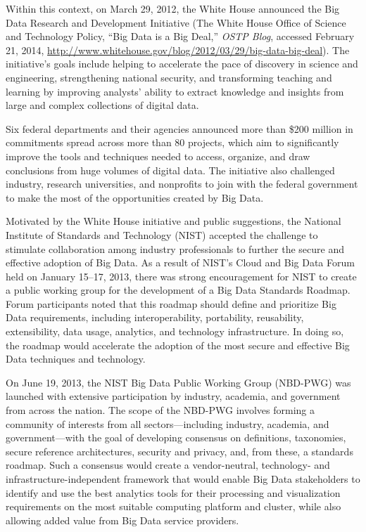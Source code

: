 \documentclass[9pt,]{article}
\begin{document}
Within this context, on March 29, 2012, the White House announced the
Big Data Research and Development Initiative (The White House Office of
Science and Technology Policy, ``Big Data is a Big Deal,'' \emph{OSTP
Blog}, accessed February 21, 2014,
\url{http://www.whitehouse.gov/blog/2012/03/29/big-data-big-deal}). The
initiative's goals include helping to accelerate the pace of discovery
in science and engineering, strengthening national security, and
transforming teaching and learning by improving analysts' ability to
extract knowledge and insights from large and complex collections of
digital data.

Six federal departments and their agencies announced more than \$200
million in commitments spread across more than 80 projects, which aim to
significantly improve the tools and techniques needed to access,
organize, and draw conclusions from huge volumes of digital data. The
initiative also challenged industry, research universities, and
nonprofits to join with the federal government to make the most of the
opportunities created by Big Data.

Motivated by the White House initiative and public suggestions, the
National Institute of Standards and Technology (NIST) accepted the
challenge to stimulate collaboration among industry professionals to
further the secure and effective adoption of Big Data. As a result of
NIST's Cloud and Big Data Forum held on January 15--17, 2013, there was
strong encouragement for NIST to create a public working group for the
development of a Big Data Standards Roadmap. Forum participants noted
that this roadmap should define and prioritize Big Data requirements,
including interoperability, portability, reusability, extensibility,
data usage, analytics, and technology infrastructure. In doing so, the
roadmap would accelerate the adoption of the most secure and effective
Big Data techniques and technology.

On June 19, 2013, the NIST Big Data Public Working Group (NBD-PWG) was
launched with extensive participation by industry, academia, and
government from across the nation. The scope of the NBD-PWG involves
forming a community of interests from all sectors---including industry,
academia, and government---with the goal of developing consensus on
definitions, taxonomies, secure reference architectures, security and
privacy, and, from these, a standards roadmap. Such a consensus would
create a vendor-neutral, technology- and infrastructure-independent
framework that would enable Big Data stakeholders to identify and use
the best analytics tools for their processing and visualization
requirements on the most suitable computing platform and cluster, while
also allowing added value from Big Data service providers.
\end{document}
